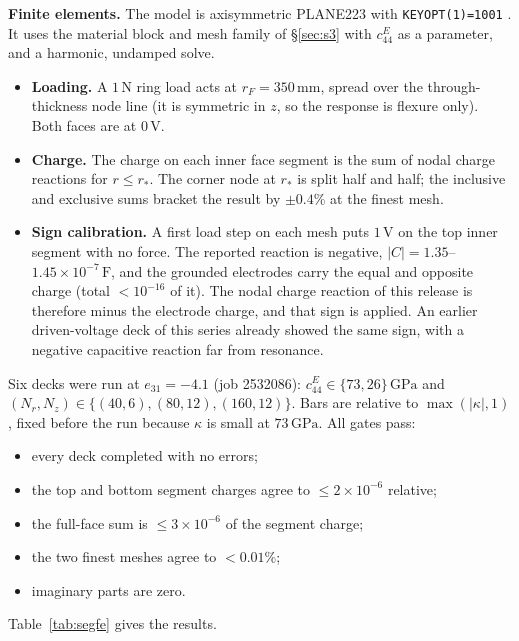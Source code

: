 \documentclass[11pt]{article}
\begin{document}
\textbf{Finite elements.} The model is axisymmetric PLANE223 with
\texttt{KEYOPT(1)=1001} \cite{ansys}. It uses the material block and mesh
family of \S\ref{sec:s3} with $c_{44}^E$ as a parameter, and a harmonic,
undamped solve.
\begin{itemize}
\item \textbf{Loading.} A $1\,\mathrm N$ ring load acts at
$r_F=350\,\mathrm{mm}$, spread over the through-thickness node line (it
is symmetric in $z$, so the response is flexure only). Both faces are at
$0\,\mathrm V$.
\item \textbf{Charge.} The charge on each inner face segment is the sum
of nodal charge reactions for $r\le r_*$. The corner node at $r_*$ is
split half and half; the inclusive and exclusive sums bracket the result
by $\pm0.4\%$ at the finest mesh.
\item \textbf{Sign calibration.} A first load step on each mesh puts
$1\,\mathrm V$ on the top inner segment with no force. The reported
reaction is negative, $|C|=1.35$--$1.45\times10^{-7}\,\mathrm F$, and the
grounded electrodes carry the equal and opposite charge (total
$<10^{-16}$ of it). The nodal charge reaction of this release is therefore
minus the electrode charge, and that sign is applied. An earlier
driven-voltage deck of this series already showed the same sign, with a
negative capacitive reaction far from resonance.
\end{itemize}

Six decks were run at $e_{31}=-4.1$ (job 2532086):
$c_{44}^E\in\{73,26\}\,\mathrm{GPa}$ and
$(N_r,N_z)\in\{(40,6),(80,12),(160,12)\}$. Bars are relative to
$\max(\lvert\kappa\rvert,1)$, fixed before the run because $\kappa$ is
small at $73\,\mathrm{GPa}$. All gates pass:
\begin{itemize}
\item every deck completed with no errors;
\item the top and bottom segment charges agree to $\le2\times10^{-6}$ relative;
\item the full-face sum is $\le3\times10^{-6}$ of the segment charge;
\item the two finest meshes agree to $<0.01\%$;
\item imaginary parts are zero.
\end{itemize}
Table~\ref{tab:segfe} gives the results.
\end{document}
